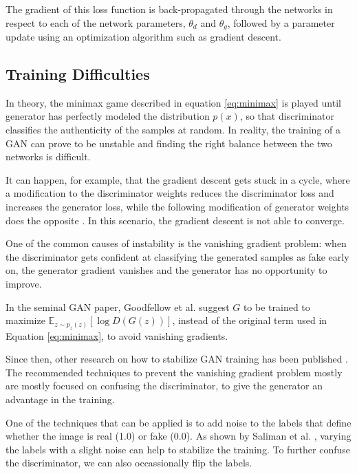 \documentclass[12pt]{report}
\begin{document}
The gradient of this loss function is back-propagated through the networks in respect to each of the network parameters, $\theta_{d}$ and $\theta_{g}$, followed by a parameter update using an optimization algorithm such as gradient descent.

\subsection{Training Difficulties} \label{sec:gan_diff}

In theory, the minimax game described in equation \ref{eq:minimax} is played until generator has perfectly modeled the distribution $p(x)$, so that discriminator classifies the authenticity of the samples at random. In reality, the training of a GAN can prove to be unstable and finding the right balance between the two networks is difficult.

It can happen, for example, that the gradient descent gets stuck in a cycle, where a modification to the discriminator weights reduces the discriminator loss and increases the generator loss, while the following modification of generator weights does the opposite \cite{salimans_improved_2016}. In this scenario, the gradient descent is not able to converge.

One of the common causes of instability is the vanishing gradient problem: when the discriminator gets confident at classifying the generated samples as fake early on, the generator gradient vanishes and the generator has no opportunity to improve. 

In the seminal GAN paper, Goodfellow et al. \cite{goodfellow_generative_2014} suggest $G$ to be trained to maximize $\mathbb{E}_{z \sim p_{z}(z)}[\log D(G(z))]$, instead of the original term used in Equation \ref{eq:minimax}, to avoid vanishing gradients. 

Since then, other research on how to stabilize GAN training has been published \cite{arjovsky_towards_2017}\cite{roth_stabilizing_2017}\cite{salimans_improved_2016}. The recommended techniques to prevent the vanishing gradient problem mostly are mostly focused on confusing the discriminator, to give the generator an advantage in the training. 

One of the techniques that can be applied is to add noise to the labels that define whether the image is real (1.0) or fake (0.0). As shown by Saliman et al. \cite{salimans_improved_2016}, varying the labels with a slight noise can help to stabilize the training. To further confuse the discriminator, we can also occassionally flip the labels. 
\end{document}

